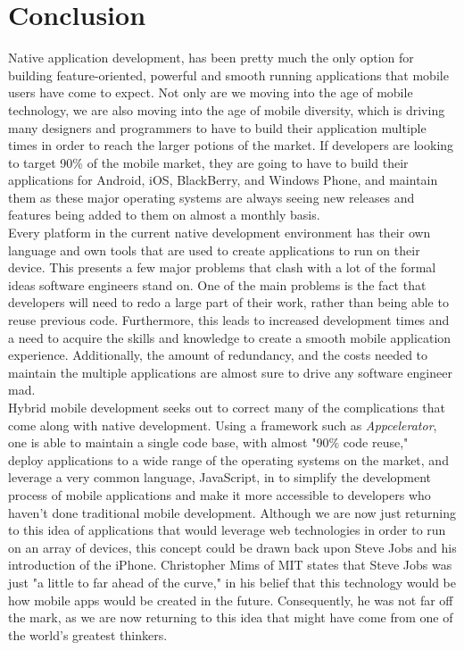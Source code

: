 \documentclass[11pt, twocolumn]{article}
\begin{document}
\section{Conclusion}
Native application development, has been pretty much the only option for building feature-oriented, powerful and smooth running applications that mobile users have come to expect.  Not only are we moving into the age of mobile technology, we are also moving into the age of mobile diversity, which is driving many designers and programmers to have to build their application multiple times in order to reach the larger potions of the market.  If developers are looking to target 90\% of the mobile market, they are going to have to build their applications for Android, iOS, BlackBerry, and Windows Phone, and maintain them as these major operating systems are always seeing new releases and features being added to them on almost a monthly basis.\\

Every platform in the current native development environment has their own language and own tools that are used to create applications to run on their device. This presents a few major problems that clash with a lot of the formal ideas software engineers stand on.  One of the main problems is the fact that developers will need to redo a large part of their work, rather than being able to reuse previous code.  Furthermore, this leads to increased development times and a need to acquire the skills and knowledge to create a smooth mobile application experience.  Additionally, the amount of redundancy, and the costs needed to maintain the multiple applications are almost sure to drive any software engineer mad.\\

Hybrid mobile development seeks out to correct many of the complications that come along with native development.  Using a framework such as {\it Appcelerator}, one is able to maintain a single code base, with almost "90\% code reuse," ~\cite{Appcelerator.com2012} deploy applications to a wide range of the operating systems on the market, and leverage a very common language, JavaScript, in to simplify the development process of mobile applications and make it more accessible to developers who haven't done traditional mobile development.  Although we are now just returning to this idea of applications that would leverage web technologies in order to run on an array of devices, this concept could be drawn back upon Steve Jobs and his introduction of the iPhone. Christopher Mims of MIT states that Steve Jobs was just "a little to far ahead of the curve," in his belief that this technology would be how mobile apps would be created in the future.  Consequently, he was not far off the mark, as we are now returning to this idea that might have come from one of the world's greatest thinkers.\\
\end{document}
